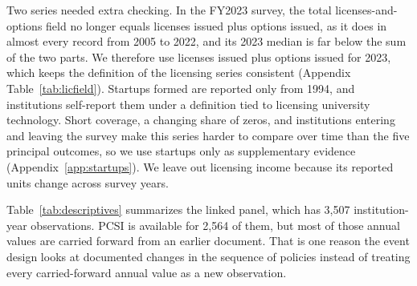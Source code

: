 Two series needed extra checking. In the FY2023 survey, the total licenses-and-options field no longer equals licenses issued plus options issued, as it does in almost every record from 2005 to 2022, and its 2023 median is far below the sum of the two parts. We therefore use licenses issued plus options issued for 2023, which keeps the definition of the licensing series consistent (Appendix Table~\ref{tab:licfield}). Startups formed are reported only from 1994, and institutions self-report them under a definition tied to licensing university technology. Short coverage, a changing share of zeros, and institutions entering and leaving the survey make this series harder to compare over time than the five principal outcomes, so we use startups only as supplementary evidence (Appendix~\ref{app:startups}). We leave out licensing income because its reported units change across survey years.

Table~\ref{tab:descriptives} summarizes the linked panel, which has 3,507 institution-year observations. PCSI is available for 2,564 of them, but most of those annual values are carried forward from an earlier document. That is one reason the event design looks at documented changes in the sequence of policies instead of treating every carried-forward annual value as a new observation.

